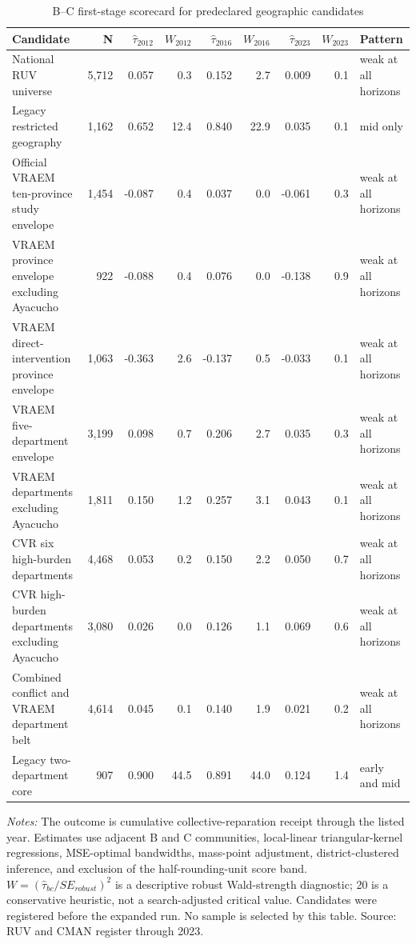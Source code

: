 \begin{table}[!htbp]
\centering
\scriptsize
\caption{B--C first-stage scorecard for predeclared geographic candidates}
\label{tab:rd_design_candidate_scorecard}
\begin{tabular}{lrrrrrrrl}
\toprule
Candidate & N & \(\widehat{\tau}_{2012}\) & \(W_{2012}\) & \(\widehat{\tau}_{2016}\) & \(W_{2016}\) & \(\widehat{\tau}_{2023}\) & \(W_{2023}\) & Pattern \\
\midrule
National RUV universe & 5,712 & 0.057 & 0.3 & 0.152 & 2.7 & 0.009 & 0.1 & weak at all horizons \\
Legacy restricted geography & 1,162 & 0.652 & 12.4 & 0.840 & 22.9 & 0.035 & 0.1 & mid only \\
Official VRAEM ten-province study envelope & 1,454 & -0.087 & 0.4 & 0.037 & 0.0 & -0.061 & 0.3 & weak at all horizons \\
VRAEM province envelope excluding Ayacucho & 922 & -0.088 & 0.4 & 0.076 & 0.0 & -0.138 & 0.9 & weak at all horizons \\
VRAEM direct-intervention province envelope & 1,063 & -0.363 & 2.6 & -0.137 & 0.5 & -0.033 & 0.1 & weak at all horizons \\
VRAEM five-department envelope & 3,199 & 0.098 & 0.7 & 0.206 & 2.7 & 0.035 & 0.3 & weak at all horizons \\
VRAEM departments excluding Ayacucho & 1,811 & 0.150 & 1.2 & 0.257 & 3.1 & 0.043 & 0.1 & weak at all horizons \\
CVR six high-burden departments & 4,468 & 0.053 & 0.2 & 0.150 & 2.2 & 0.050 & 0.7 & weak at all horizons \\
CVR high-burden departments excluding Ayacucho & 3,080 & 0.026 & 0.0 & 0.126 & 1.1 & 0.069 & 0.6 & weak at all horizons \\
Combined conflict and VRAEM department belt & 4,614 & 0.045 & 0.1 & 0.140 & 1.9 & 0.021 & 0.2 & weak at all horizons \\
Legacy two-department core & 907 & 0.900 & 44.5 & 0.891 & 44.0 & 0.124 & 1.4 & early and mid \\
\bottomrule
\end{tabular}
\parbox{0.98\linewidth}{\footnotesize \textit{Notes:} The outcome is cumulative collective-reparation receipt through the listed year. Estimates use adjacent B and C communities, local-linear triangular-kernel regressions, MSE-optimal bandwidths, mass-point adjustment, district-clustered inference, and exclusion of the half-rounding-unit score band. \(W=(\widehat{\tau}_{bc}/SE_{robust})^2\) is a descriptive robust Wald-strength diagnostic; 20 is a conservative heuristic, not a search-adjusted critical value. Candidates were registered before the expanded run. No sample is selected by this table. Source: RUV and CMAN register through 2023.}
\end{table}
